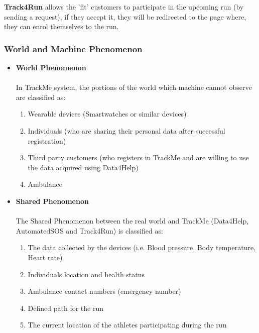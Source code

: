 \documentclass[12pt]{article}
\begin{document}
\textbf{Track4Run} allows the 'fit' customers to participate in the upcoming run (by sending a request), if they accept it, they will be redirected to the page where, they can enrol themselves to the run.\\

\subsubsection{World and Machine Phenomenon}
\begin{itemize}
\item \textbf{World Phenomenon}
\\
\\
In TrackMe system, the portions of the world which machine cannot observe are classified as:
\begin{enumerate}
\item{} Wearable devices (Smartwatches or similar devices)
\item{} Individuals (who are sharing their personal data after successful registration)
\item{} Third party customers (who registers in TrackMe and are willing to use the data acquired using Data4Help)
\item{} Ambulance 
\end{enumerate}

\item \textbf{Shared Phenomenon}
\\
\\
The Shared Phenomenon between the real world and TrackMe (Data4Help, AutomatedSOS and Track4Run) is classified as:
\begin{enumerate}
\item{} The data collected by the devices (i.e. Blood pressure, Body temperature, Heart rate)
\item{} Individuals location and health status
\item{} Ambulance contact numbers (emergency number)
\item{} Defined path for the run
\item{} The current location of the athletes participating during the run
\end{enumerate}
\end{itemize}
\end{document}
